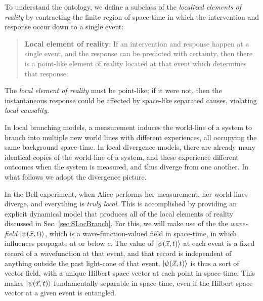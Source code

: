 \documentclass[12pt]{article}
\begin{document}
To understand the ontology, we define a subclass of the \textit{localized elements of reality} by contracting the finite region of space-time in which the intervention and response occur down to a single event:

\begin{quote}
\textbf{Local element of reality}: If an intervention and response happen at a single event, and the response can be predicted with certainty, then there is a point-like element of reality located at that event which determines that response.
\end{quote}

The \textit{local element of reality} must be point-like; if it were not, then the instantaneous response could be affected by space-like separated causes, violating \textit{local causality}.

In local branching models, a measurement induces the world-line of a system to branch into multiple new world lines with different experiences, all occupying the same background space-time. In local divergence models, there are already many identical copies of the world-line of a system, and these experience different outcomes when the system is measured, and thus diverge from one another. In what follows we adopt the divergence picture.

In the Bell experiment, when Alice performs her measurement, her world-lines diverge, and everything is \textit{truly local}.  This is accomplished by providing an explicit dynamical model that produces all of the local elements of reality discussed in Sec. \ref{sec:SLocBranch}.  For this, we will make use of the the \textit{wave-field} $\Ket{\psi(\vec{x},t)}$, which is a wave-function-valued field in space-time, in which influences propagate at or below $c$.  The value of $\Ket{\psi(\vec{x},t)}$ at each event is a fixed record of a wavefunction at that event, and that record is independent of anything outside the past light-cone of that event.  $\Ket{\psi(\vec{x},t)}$ is thus a sort of vector field, with a unique Hilbert space vector at each point in space-time.  This makes $\Ket{\psi(\vec{x},t)}$ fundamentally separable in space-time, even if the Hilbert space vector at a given event is entangled.
\end{document}
